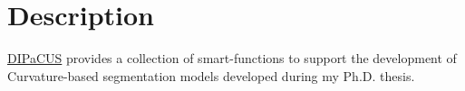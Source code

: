 \hypertarget{index_Description}{}\section{Description}\label{index_Description}
\hyperlink{namespaceDIPaCUS}{D\+I\+Pa\+C\+US} provides a collection of smart-\/functions to support the development of Curvature-\/based segmentation models developed during my Ph.\+D. thesis. 